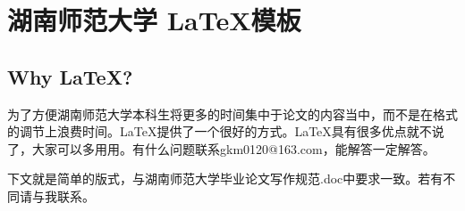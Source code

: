 
\chapter{湖南师范大学 \LaTeX 模板}

\section{Why \LaTeX ? }

为了方便湖南师范大学本科生将更多的时间集中于论文的内容当中，而不是在格式的调节上浪费时间。\LaTeX 提供了一个很好的方式。\LaTeX 具有很多优点就不说了，大家可以多用用。有什么问题联系gkm0120@163.com，能解答一定解答。
\par 下文就是简单的版式，与湖南师范大学毕业论文写作规范.doc中要求一致。若有不同请与我联系。